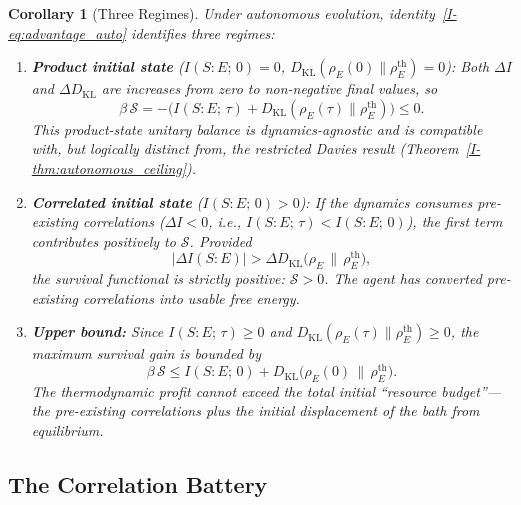 \documentclass[12pt,a4paper,openany]{book}
\newtheorem{corollary}[theorem]{Corollary}
\begin{document}
\begin{corollary}[Three Regimes]
\label{I-cor:three_regimes}
Under autonomous evolution, identity~\eqref{I-eq:advantage_auto}
identifies three regimes:
\begin{enumerate}
\item \textbf{Product initial state}
  ($I(S{:}E;\, 0) = 0$,
  $D_{\mathrm{KL}}(\rho_E(0) \| \rho_E^{\mathrm{th}}) = 0$):
  Both $\Delta I$ and $\Delta D_{\mathrm{KL}}$ are increases
  from zero to non-negative final values, so
  \[
  \beta\,\mathcal{S}
  = -\bigl(I(S{:}E;\,\tau)
  + D_{\mathrm{KL}}(\rho_E(\tau) \| \rho_E^{\mathrm{th}})\bigr)
  \leq 0.
  \]
  This product-state unitary balance is dynamics-agnostic and is
  compatible with, but logically distinct from, the restricted Davies
  result (Theorem~\ref{I-thm:autonomous_ceiling}).

\item \textbf{Correlated initial state}
  ($I(S{:}E;\, 0) > 0$):
  If the dynamics \emph{consumes} pre-existing correlations
  ($\Delta I < 0$, i.e., $I(S{:}E;\, \tau) < I(S{:}E;\, 0)$),
  the first term contributes \emph{positively} to
  $\mathcal{S}$.
  Provided
  \begin{equation}
  \label{I-eq:ceiling_breach}
  |\Delta I(S{:}E)| > \Delta D_{\mathrm{KL}}\!\bigl(\rho_E
  \,\big\|\, \rho_E^{\mathrm{th}}\bigr),
  \end{equation}
  the survival functional is strictly positive:
  $\mathcal{S} > 0$.
  The agent has converted pre-existing correlations into
  usable free energy.

\item \textbf{Upper bound:}
  Since $I(S{:}E;\, \tau) \geq 0$ and
  $D_{\mathrm{KL}}(\rho_E(\tau) \| \rho_E^{\mathrm{th}})
  \geq 0$, the maximum survival gain is bounded by
  \begin{equation}
  \label{I-eq:S_upper}
  \beta\,\mathcal{S}
  \leq I(S{:}E;\, 0)
    + D_{\mathrm{KL}}\!\bigl(\rho_E(0) \,\big\|\,
      \rho_E^{\mathrm{th}}\bigr).
  \end{equation}
  The thermodynamic profit cannot exceed the total initial
  ``resource budget''---the pre-existing correlations plus
  the initial displacement of the bath from equilibrium.
\end{enumerate}
\end{corollary}

\subsection{The Correlation Battery}
\end{document}
